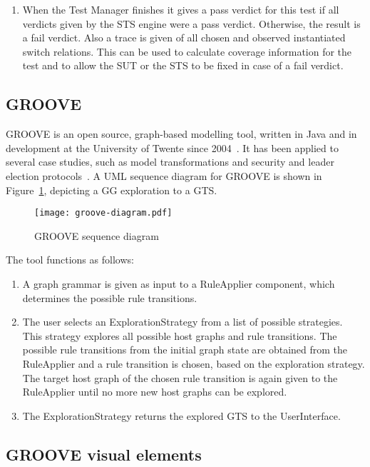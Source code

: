 \begin{enumerate}
  \item When the Test Manager finishes it gives a pass verdict for this test if all verdicts given by the STS engine were a pass verdict. Otherwise, the result is a fail verdict. Also a trace is given of all chosen and observed instantiated switch relations. This can be used to calculate coverage information for the test and to allow the SUT or the STS to be fixed in case of a fail verdict.
\end{enumerate}

\subsection{GROOVE}\label{sec:descriptiongroove}
GROOVE is an open source, graph-based modelling tool, written in Java and in development at the University of Twente since 2004~\cite{Rensink:GROOVE}. It has been applied to several case studies, such as model transformations and security and leader election protocols~\cite{Ghamarian:GROOVE}. A UML sequence diagram for GROOVE is shown in Figure~\ref{fig:groove_tool}, depicting a GG exploration to a GTS.

\begin{figure}[h]
  \begin{center}
    \texttt{[image: groove-diagram.pdf]}
  \end{center}
  \caption{GROOVE sequence diagram}
  \label{fig:groove_tool}
\end{figure}

The tool functions as follows:
\begin{enumerate}
\item A graph grammar is given as input to a RuleApplier component, which determines the possible rule transitions.
\item The user selects an ExplorationStrategy from a list of possible strategies. This strategy explores all possible host graphs and rule transitions. The possible rule transitions from the initial graph state are obtained from the RuleApplier and a rule transition is chosen, based on the exploration strategy. The target host graph of the chosen rule transition is again given to the RuleApplier until no more new host graphs can be explored.
\item The ExplorationStrategy returns the explored GTS to the UserInterface.
\end{enumerate}

\subsection{GROOVE visual elements}

